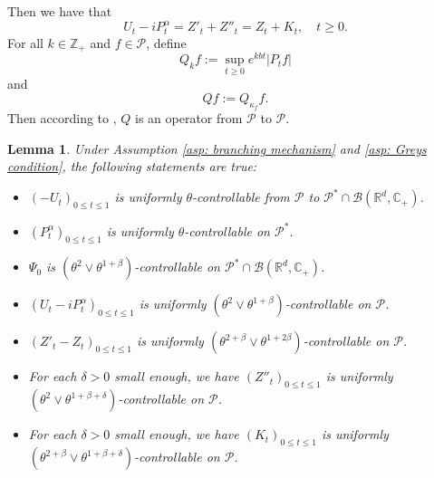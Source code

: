 \documentclass[12pt,a4paper]{amsart}
\theoremstyle{plain}
\newtheorem{lem}[thm]{Lemma}
\theoremstyle{definition}
\numberwithin{equation}{section}
\begin{document}
    Then we have that
\[
    U_t - i P^\alpha_t
    = Z'_t + Z''_t
    = Z_t+K_t, \quad t\geq 0.
\]
	For all $k \in \mathbb Z_+$ and $f\in \mathcal P$, define
\begin{equation}\label{Q_k}
    Q_k f 
    := \sup_{t\geq 0} e^{k b t}|P_t f|
\end{equation}
    and
\begin{equation}\label{Q}
    Q f:= Q_{\kappa_f}f.
\end{equation}
    Then according to \cite[Fact 1.2]{MarksMilos2018CLT}, $Q$ is an operator from $\mathcal P$ to $\mathcal P$.

\begin{lem}
\label{lem: upper bound for usgx}
    Under Assumption \ref{asp: branching mechanism} and \ref{asp: Greys condition}, the following statements are true:
\begin{itemize}
\item[(1)]
    $(-U_t)_{0\leq t\leq 1}$ is uniformly $\theta$-controllable from $\mathcal P$ to $\mathcal P^*\cap \mathcal B(\mathbb R^d, \mathbb C_+)$.
\item[(2)]
    $(P^\alpha_t)_{0\leq t\leq 1}$ is uniformly $\theta$-controllable on $\mathcal P^*$.
\item[(3)]
    $\Psi_0$ is $(\theta^2\vee \theta^{1+\beta})$-controllable on $\mathcal P^* \cap \mathcal B(\mathbb R^d, \mathbb C_+)$.
\item[(4)]
    $(U_t- iP_t^{\alpha})_{0\leq t\leq 1}$ is uniformly $(\theta^2\vee \theta^{1+\beta})$-controllable on $\mathcal P$.
\item[(5)]
    $(Z'_t-Z_t)_{0\leq t\leq 1}$ is uniformly $(\theta^{2+\beta}\vee \theta^{1+2\beta})$-controllable on $\mathcal P$.
\item[(6)]
    For each $\delta > 0$ small enough, we have $(Z''_t)_{0\leq t\leq 1}$ is uniformly $(\theta^2\vee \theta^{1+\beta+\delta})$-controllable on $\mathcal P$.
\item[(7)]
    For each $\delta > 0$ small enough, we have $(K_t)_{0\leq t\leq 1}$ is uniformly $(\theta^{2+\beta}\vee \theta^{1+\beta+\delta})$-controllable on $\mathcal P$.
\end{itemize}
\end{lem}
\end{document}
